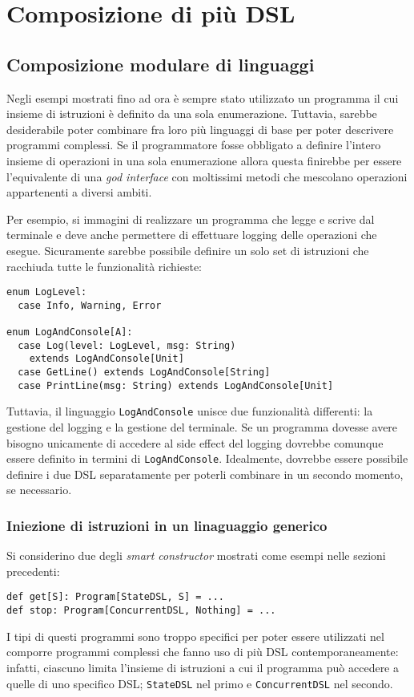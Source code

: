 \section{Composizione di più DSL}

\subsection{Composizione modulare di linguaggi}
Negli esempi mostrati fino ad ora è sempre stato utilizzato un programma il cui insieme di istruzioni è definito da una sola enumerazione. Tuttavia, sarebbe desiderabile poter combinare fra loro più linguaggi di base per poter descrivere programmi complessi. Se il programmatore fosse obbligato a definire l'intero insieme di operazioni in una sola enumerazione allora questa finirebbe per essere l'equivalente di una \emph{god interface} con moltissimi metodi che mescolano operazioni appartenenti a diversi ambiti.

Per esempio, si immagini di realizzare un programma che legge e scrive dal terminale e deve anche permettere di effettuare logging delle operazioni che esegue. Sicuramente sarebbe possibile definire un solo set di istruzioni che racchiuda tutte le funzionalità richieste:
\begin{lstlisting}[language=scala3]
enum LogLevel:
  case Info, Warning, Error

enum LogAndConsole[A]:
  case Log(level: LogLevel, msg: String)
    extends LogAndConsole[Unit]
  case GetLine() extends LogAndConsole[String]
  case PrintLine(msg: String) extends LogAndConsole[Unit]
\end{lstlisting}
Tuttavia, il linguaggio \lstinline{LogAndConsole} unisce due funzionalità differenti: la gestione del logging e la gestione del terminale.
Se un programma dovesse avere bisogno unicamente di accedere al side effect del logging dovrebbe comunque essere definito in termini di \lstinline{LogAndConsole}.
Idealmente, dovrebbe essere possibile definire i due DSL separatamente per poterli combinare in un secondo momento, se necessario.

\subsubsection{Iniezione di istruzioni in un linaguaggio generico}
Si considerino due degli \emph{smart constructor} mostrati come esempi nelle sezioni precedenti:
\begin{lstlisting}[language=scala3]
def get[S]: Program[StateDSL, S] = ...
def stop: Program[ConcurrentDSL, Nothing] = ...
\end{lstlisting}
I tipi di questi programmi sono troppo specifici per poter essere utilizzati nel comporre programmi complessi che fanno uso di più DSL contemporaneamente: infatti, ciascuno limita l'insieme di istruzioni a cui il programma può accedere a quelle di uno specifico DSL; \lstinline{StateDSL} nel primo e \lstinline{ConcurrentDSL} nel secondo.

